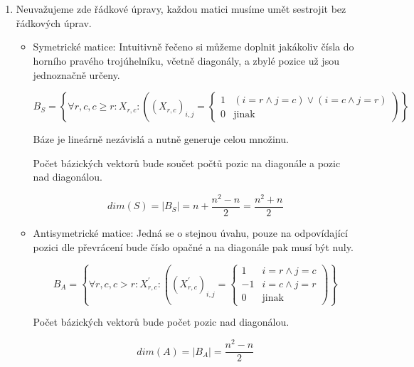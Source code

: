 \documentclass[10pt,a4paper]{article}
\begin{document}
\section{}
\begin{enumerate}[label=\roman*]
\item Neuvažujeme zde řádkové úpravy, každou matici musíme umět sestrojit bez řádkových úprav.


\begin{itemize}
\item 
Symetrické matice: Intuitivně řečeno si můžeme doplnit jakákoliv čísla do horního pravého trojúhelníku, včetně diagonály, a zbylé pozice už jsou jednoznačně určeny.


\begin{equation*}
B_S = \left\{ \forall r, c, c \geq r: X_{r,c}: \left( (X_{r,c})_{i,j} = \begin{cases} 1 & (i = r \wedge j = c) \vee (i = c \wedge j = r) \\ 0 & \text{jinak} \end{cases} \right) \right\}
\end{equation*}

Báze je lineárně nezávislá a nutně generuje celou množinu.

Počet bázických vektorů bude součet počtů pozic na diagonále a pozic nad diagonálou.

\begin{equation*}
dim(S) = |B_S| = n + \frac{n^2 - n}2 = \frac{n^2 + n}2
\end{equation*}

\item Antisymetrické matice: Jedná se o stejnou úvahu, pouze na odpovídající pozici dle převrácení bude číslo opačné a na diagonále pak musí být nuly.

\begin{equation*}
B_A = \left\{ \forall r, c, c > r: X^\prime_{r,c}: \left( (X^\prime_{r,c})_{i,j}  = 
\begin{cases} 
1 & i = r \wedge j = c \\
-1 & i = c \wedge j = r \\
0 & \text{jinak} 
\end{cases}
\right) \right\}
\end{equation*}

Počet bázických vektorů bude počet pozic nad diagonálou.

\begin{equation*}
dim(A) = |B_A| = \frac{n^2 - n}2
\end{equation*}


\end{itemize}
\end{enumerate}
\end{document}
